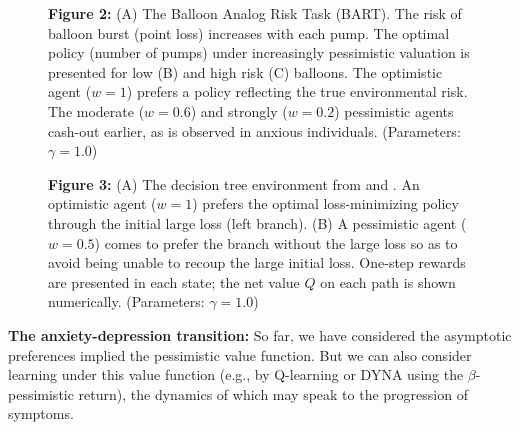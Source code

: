 \documentclass[11pt]{article} %
\begin{document}
\begin{figure}
  \centerline{%
  }
  \par \textbf{Figure 2:} (A) The Balloon Analog Risk Task (BART). The risk of balloon burst (point loss) increases with each pump. The optimal policy (number of pumps) under increasingly pessimistic valuation is presented for low (B) and high risk (C) balloons. The optimistic agent ($w=1$) prefers a policy reflecting the true environmental risk. The moderate ($w=0.6$) and strongly ($w=0.2$) pessimistic agents cash-out earlier, as is observed in anxious individuals. (Parameters: $\gamma = 1.0$)
\end{figure}

\begin{figure}[!b]
  \centerline{%
  }
  \par \textbf{Figure 3:} (A) The decision tree environment from \cite{Huys2012} and \cite{Lally2017}. An optimistic agent ($w=1$) prefers the optimal loss-minimizing policy through the initial large loss (left branch). (B) A pessimistic agent ($w=0.5$) comes to prefer the branch without the large loss so as to avoid being unable to recoup the large initial loss. One-step rewards are presented in each state; the net value $Q$ on each path is shown numerically. (Parameters: $\gamma = 1.0$)
\end{figure}

\textbf{The anxiety-depression transition:} So far, we have considered the asymptotic preferences implied the pessimistic value function. But we can also consider learning under this value function (e.g., by Q-learning or DYNA using the $\beta$-pessimistic return), the dynamics of which may speak to the progression of symptoms.
\end{document}
